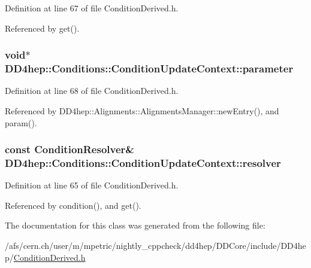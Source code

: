 Definition at line 67 of file ConditionDerived.h.

Referenced by get().\hypertarget{class_d_d4hep_1_1_conditions_1_1_condition_update_context_adad82de460a5c71b568e73e2f76923ba}{
\subsubsection[{parameter}]{\setlength{\rightskip}{0pt plus 5cm}void$\ast$ {\bf DD4hep::Conditions::ConditionUpdateContext::parameter}}}
\label{class_d_d4hep_1_1_conditions_1_1_condition_update_context_adad82de460a5c71b568e73e2f76923ba}


Definition at line 68 of file ConditionDerived.h.

Referenced by DD4hep::Alignments::AlignmentsManager::newEntry(), and param().\hypertarget{class_d_d4hep_1_1_conditions_1_1_condition_update_context_afec7d015ccb53ab2c84eec000846b15d}{
\subsubsection[{resolver}]{\setlength{\rightskip}{0pt plus 5cm}const {\bf ConditionResolver}\& {\bf DD4hep::Conditions::ConditionUpdateContext::resolver}}}
\label{class_d_d4hep_1_1_conditions_1_1_condition_update_context_afec7d015ccb53ab2c84eec000846b15d}


Definition at line 65 of file ConditionDerived.h.

Referenced by condition(), and get().

The documentation for this class was generated from the following file:\begin{DoxyCompactItemize}
\item 
/afs/cern.ch/user/m/mpetric/nightly\_\-cppcheck/dd4hep/DDCore/include/DD4hep/\hyperlink{_condition_derived_8h}{ConditionDerived.h}\end{DoxyCompactItemize}
